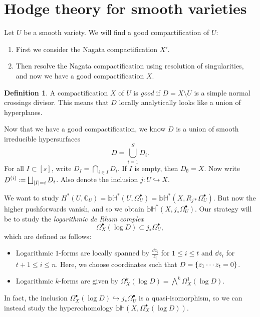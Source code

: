 \documentclass[leqno, openany]{memoir}
\theoremstyle{definition}
\newtheorem{defn}[thm]{Definition}
\theoremstyle{remark}
\theoremstyle{plain}
\theoremstyle{definition}
\theoremstyle{remark}
\newcommand{\bH}{\mathbb{bH}}
\newcommand{\C}{\mathbb{C}}
\begin{document}
\section{Hodge theory for smooth varieties}%
\label{sec:hodge_theory_for_smooth_varieties}

Let $U$ be a smooth variety. We will find a good compactification of $U$:
\begin{enumerate}
    \item First we consider the Nagata compactification $X'$.
    \item Then resolve the Nagata compactification using resolution of singularities, and now we have a good compactification $X$.
\end{enumerate}

\begin{defn}
    A compactification $X$ of $U$ is \textit{good} if $D = X \setminus U$ is a simple normal crossings divisor. This means that $D$ locally analytically looks like a union of hyperplanes.
\end{defn}

Now that we have a good compactification, we know $D$ is a union of smooth irreducible hypersurfaces 
\[ D = \bigcup_{i=1}^S D_i. \]
For all $I \subset [s]$, write $D_I = \bigcap_{i \in I} D_i$. If $I$ is empty, then $D_{\emptyset} = X$. Now write $D^{(i)} \coloneqq \bigsqcup_{\abs{I} = i} D_i$. Also denote the inclusion $j \colon U \hookrightarrow X$.

We want to study $H^*(U, \C_U) = \bH^*(U, \Omega^{\bullet}_U) = \bH^*(X, R_{j*} \Omega^{\bullet}_U)$. But now the higher pushforwards vanish, and so we obtain $\bH^*(X, j_* \Omega_U^{\bullet})$. Our strategy will be to study the \textit{logarithmic de Rham complex}
\[ \Omega^{\bullet}_X(\log D) \subset j_* \Omega^{\bullet}_U, \]
which are defined as follows:
\begin{itemize}
    \item Logarithmic $1$-forms are locally spanned by $\frac{\dd{z_i}}{z_i}$ for $1 \leq i \leq t$ and $\dd{z_i}$ for $t+1 \leq i \leq n$. Here, we choose coordinates such that $D = \qty{z_1 \cdots z_t = 0}$.
    \item Logarithmic $k$-forms are given by $\Omega^k_X(\log D) = \bigwedge^k \Omega^1_X(\log D)$.
\end{itemize}
In fact, the inclusion $\Omega_X^{\bullet}(\log D) \hookrightarrow j_* \Omega_U^{\bullet}$ is a quasi-isomorphism, so we can instead study the hypercohomology $\bH(X, \Omega_X^{\bullet}(\log D))$.
\end{document}
